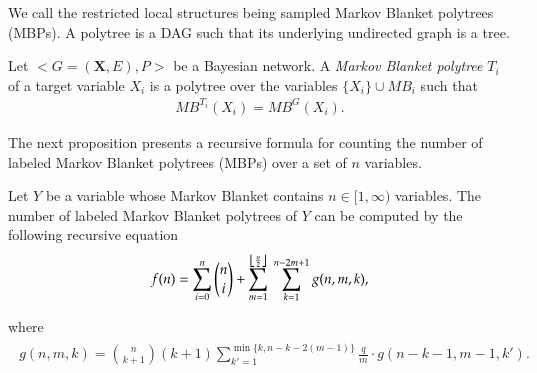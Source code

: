 \documentclass{svmult}
\begin{document}
We call the restricted local structures being sampled Markov Blanket
polytrees (MBPs). A polytree is a DAG such that its underlying
undirected graph is a tree.
\begin{definition}
Let $<G=(\mathbf{X},E),P>$ be a Bayesian network. A \textit{Markov Blanket polytree} $T_i$ of a target variable $X_i$ is a polytree over the variables $\{X_i\} \cup MB_i$ such that 
\begin{align*}
MB^{T_i}(X_i) = MB^G(X_i).
\end{align*}
\end{definition}


The next proposition presents a recursive formula for counting the
number of labeled Markov Blanket polytrees (MBPs) over a set of $n$
variables.
\begin{proposition}
\label{prop:nmbps}
Let $Y$ be a variable whose Markov Blanket contains
$n \in [1, \infty)$ variables. The number of labeled Markov Blanket
polytrees of $Y$ can be computed by the following recursive equation
\begin{align}
\label{eq:nmbps}
f(n) = \sum_{i=0}^n \binom{n}{i} + \sum_{m=1}^{\floor*{\frac{n}{2}}} ~\sum_{k=1}^{n-2m+1} g(n,m,k),
\end{align}
\end{proposition}
where
\begin{align*}
\begin{split}
g(n,m,k) = \binom{n}{k+1}(k+1) \sum_{k'=1}^{\min\{k, n-k-2(m-1)\}}\frac{q}{m} \cdot g(n-k-1,m-1,k').
\end{split}
\end{align*}
\end{document}

